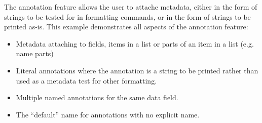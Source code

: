 \documentclass[a4paper]{article}
\begin{document}
The annotation feature allows the user to attache metadata, either in the
form of strings to be tested for in formatting commands, or in the form of
strings to be printed as-is. This example demonstrates all aspects of the
annotation feature:

\begin{itemize}
\item Metadata attaching to fields, items in a list or parts of an item in
  a list (e.g. name parts)
\item Literal annotations where the annotation is a string to be printed
  rather than used as a metadata test for other formatting.
\item Multiple named annotations for the same data field.
\item The ``default'' name for annotations with no explicit name.
\end{itemize}

\cite{ann1}
\printbibliography
\end{document}
